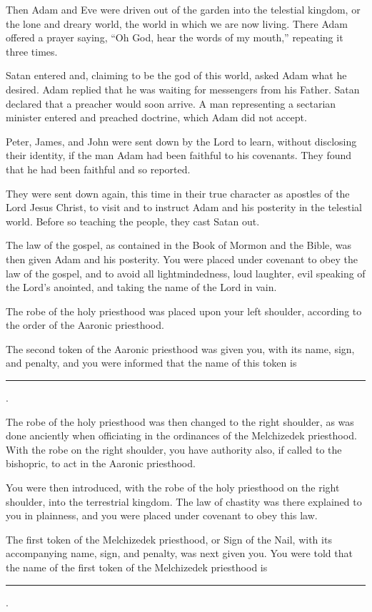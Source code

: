 				Then Adam and Eve were driven out of the garden into the telestial kingdom, or the lone and dreary world, the world in which we are now living. There Adam offered a prayer saying, ``Oh God, hear the words of my mouth,'' repeating it three times.

				Satan entered and, claiming to be the god of this world, asked Adam what he desired. Adam replied that he was waiting for messengers from his Father. Satan declared that a preacher would soon arrive. A man representing a sectarian minister entered and preached doctrine, which Adam did not accept.

				Peter, James, and John were sent down by the Lord to learn, without disclosing their identity, if the man Adam had been faithful to his covenants. They found that he had been faithful and so reported.

				They were sent down again, this time in their true character as apostles of the Lord Jesus Christ, to visit and to instruct Adam and his posterity in the telestial world. Before so teaching the people, they cast Satan out.

				The law of the gospel, as contained in the Book of Mormon and the Bible, was then given Adam and his posterity. You were placed under covenant to obey the law of the gospel, and to avoid all lightmindedness, loud laughter, evil speaking of the Lord's anointed, and taking the name of the Lord in vain.

				The robe of the holy priesthood was placed upon your left shoulder, according to the order of the Aaronic priesthood.

				The second token of the Aaronic priesthood was given you, with its name, sign, and penalty, and you were informed that the name of this token is \rule{1cm}{0.15mm}.

				The robe of the holy priesthood was then changed to the right shoulder, as was done anciently when officiating in the ordinances of the Melchizedek priesthood. With the robe on the right shoulder, you have authority also, if called to the bishopric, to act in the Aaronic priesthood.

				You were then introduced, with the robe of the holy priesthood on the right shoulder, into the terrestrial kingdom. The law of chastity was there explained to you in plainness, and you were placed under covenant to obey this law.

				The first token of the Melchizedek priesthood, or Sign of the Nail, with its accompanying name, sign, and penalty, was next given you. You were told that the name of the first token of the Melchizedek priesthood is \rule{1cm}{0.15mm}.

